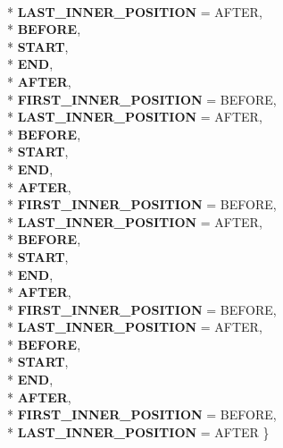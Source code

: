 \begin{DoxyCompactItemize}
\\*
{\bfseries L\+A\+S\+T\+\_\+\+I\+N\+N\+E\+R\+\_\+\+P\+O\+S\+I\+T\+I\+ON} = A\+F\+T\+ER, 
\\*
{\bfseries B\+E\+F\+O\+RE}, 
\\*
{\bfseries S\+T\+A\+RT}, 
\\*
{\bfseries E\+ND}, 
\\*
{\bfseries A\+F\+T\+ER}, 
\\*
{\bfseries F\+I\+R\+S\+T\+\_\+\+I\+N\+N\+E\+R\+\_\+\+P\+O\+S\+I\+T\+I\+ON} = B\+E\+F\+O\+RE, 
\\*
{\bfseries L\+A\+S\+T\+\_\+\+I\+N\+N\+E\+R\+\_\+\+P\+O\+S\+I\+T\+I\+ON} = A\+F\+T\+ER, 
\\*
{\bfseries B\+E\+F\+O\+RE}, 
\\*
{\bfseries S\+T\+A\+RT}, 
\\*
{\bfseries E\+ND}, 
\\*
{\bfseries A\+F\+T\+ER}, 
\\*
{\bfseries F\+I\+R\+S\+T\+\_\+\+I\+N\+N\+E\+R\+\_\+\+P\+O\+S\+I\+T\+I\+ON} = B\+E\+F\+O\+RE, 
\\*
{\bfseries L\+A\+S\+T\+\_\+\+I\+N\+N\+E\+R\+\_\+\+P\+O\+S\+I\+T\+I\+ON} = A\+F\+T\+ER, 
\\*
{\bfseries B\+E\+F\+O\+RE}, 
\\*
{\bfseries S\+T\+A\+RT}, 
\\*
{\bfseries E\+ND}, 
\\*
{\bfseries A\+F\+T\+ER}, 
\\*
{\bfseries F\+I\+R\+S\+T\+\_\+\+I\+N\+N\+E\+R\+\_\+\+P\+O\+S\+I\+T\+I\+ON} = B\+E\+F\+O\+RE, 
\\*
{\bfseries L\+A\+S\+T\+\_\+\+I\+N\+N\+E\+R\+\_\+\+P\+O\+S\+I\+T\+I\+ON} = A\+F\+T\+ER, 
\\*
{\bfseries B\+E\+F\+O\+RE}, 
\\*
{\bfseries S\+T\+A\+RT}, 
\\*
{\bfseries E\+ND}, 
\\*
{\bfseries A\+F\+T\+ER}, 
\\*
{\bfseries F\+I\+R\+S\+T\+\_\+\+I\+N\+N\+E\+R\+\_\+\+P\+O\+S\+I\+T\+I\+ON} = B\+E\+F\+O\+RE, 
\\*
{\bfseries L\+A\+S\+T\+\_\+\+I\+N\+N\+E\+R\+\_\+\+P\+O\+S\+I\+T\+I\+ON} = A\+F\+T\+ER
 \}\hypertarget{classv8_1_1internal_1_1_l_gap_ac4743ec140d442da0a1d34d826eaa9eb}{}\label{classv8_1_1internal_1_1_l_gap_ac4743ec140d442da0a1d34d826eaa9eb}

\end{DoxyCompactItemize}
